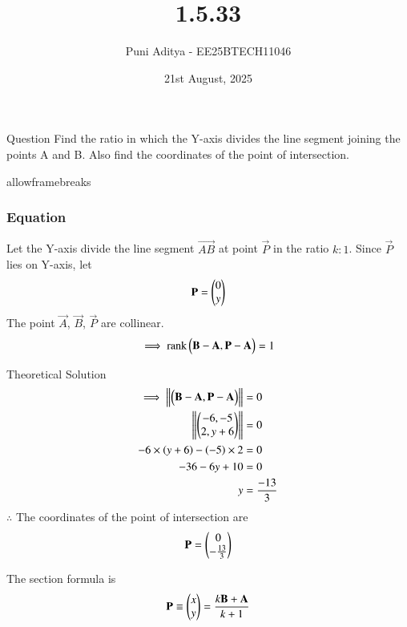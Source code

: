 \documentclass{beamer}
\title{1.5.33}
\date{21st August, 2025}
\author{Puni Aditya - EE25BTECH11046}
\begin{document}
\frame{\titlepage}
\begin{frame}{Question}
Find the ratio in which the Y-axis divides the line segment joining the points A and B. Also find the coordinates of the point of intersection.
\end{frame}

\begin{frame}{allowframebreaks}
\frametitle{Equation}
Let the Y-axis divide the line segment $\vec{AB}$ at point $\vec{P}$ in the ratio $k:1$.
Since $\vec{P}$ lies on Y-axis, let
\begin{align*}
\mathbf{P} = \begin{pmatrix}0 \\ y\end{pmatrix}
\end{align*}
The point $\vec{A}$, $\vec{B}$, $\vec{P}$ are collinear.
\begin{align}
\implies \text{rank}\begin{pmatrix}\mathbf{B}-\mathbf{A} , \mathbf{P}-\mathbf{A}\end{pmatrix} = 1
\end{align}
\end{frame}

\begin{frame}{Theoretical Solution}
\begin{align}
\implies \left\lVert\begin{pmatrix}\mathbf{B}-\mathbf{A} , \mathbf{P}-\mathbf{A}\end{pmatrix}\right\rVert &= 0 \\
\left\lVert\begin{pmatrix}-6 , -5 \\ 2 , y+6\end{pmatrix}\right\rVert &= 0 \\
-6 \times \left(y+6\right) - \left(-5\right) \times 2 &= 0 \\
-36 - 6y + 10 &= 0 \\
y &= \frac{-13}{3}
\end{align}
$\therefore$ The coordinates of the point of intersection are 
\begin{align*}
\mathbf{P} = \begin{pmatrix}0 \\ -\frac{13}{3}\end{pmatrix}
\end{align*}

The section formula is
\begin{align}
    \mathbf{P} \equiv \begin{pmatrix}x \\ y\end{pmatrix} = \frac{k\mathbf{B} + \mathbf{A}}{k+1}
\end{align}
\end{frame}
\end{document}
